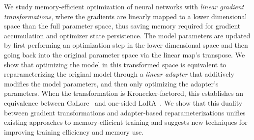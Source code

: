 We study memory-efficient optimization of neural networks with \emph{linear gradient transformations}, where the gradients are  linearly mapped to a lower dimensional space  than the full parameter space, thus saving memory required for gradient accumulation and optimizer state persistence. The model parameters are updated by first performing an optimization step in the lower dimensional space and then going back into the original parameter space via the linear map's transpose. We show that optimizing the model in this transformed space is equivalent to reparameterizing the original model through a \emph{linear adapter} that additively modifies the model parameters, and then only optimizing the adapter's parameters. When the transformation is Kronecker-factored,  this establishes an equivalence between GaLore~\citep{galore} and one-sided LoRA~\citep{lora}. We show that this duality between gradient transformations and adapter-based reparameterizations unifies existing approaches to memory-efficient training and suggests new techniques for improving training efficiency and memory use.
\vspace{-2mm}


